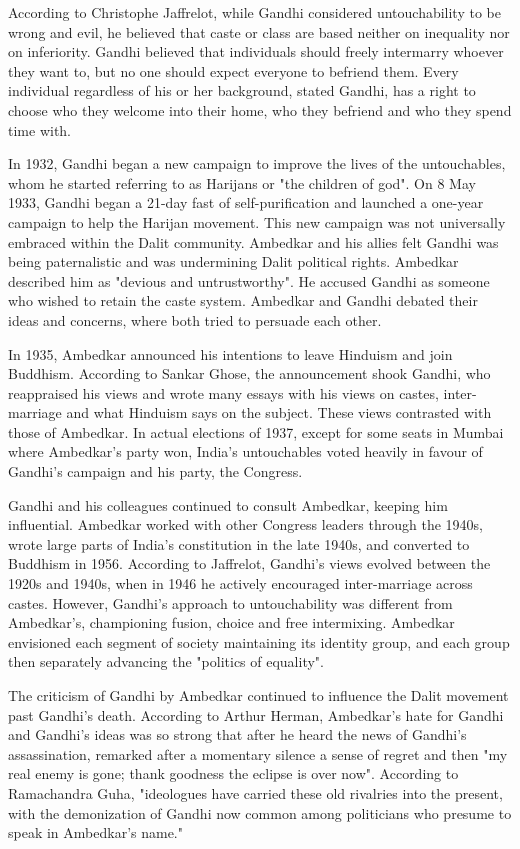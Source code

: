 According to Christophe Jaffrelot, while Gandhi considered
untouchability to be wrong and evil, he believed that caste or class are
based neither on inequality nor on inferiority. Gandhi believed that
individuals should freely intermarry whoever they want to, but no one
should expect everyone to befriend them. Every individual regardless of
his or her background, stated Gandhi, has a right to choose who they
welcome into their home, who they befriend and who they spend time with.

In 1932, Gandhi began a new campaign to improve the lives of the
untouchables, whom he started referring to as Harijans or "the children
of god". On 8 May 1933, Gandhi began a 21-day fast of self-purification
and launched a one-year campaign to help the Harijan movement. This new
campaign was not universally embraced within the Dalit community.
Ambedkar and his allies felt Gandhi was being paternalistic and was
undermining Dalit political rights. Ambedkar described him as "devious
and untrustworthy". He accused Gandhi as someone who wished to retain
the caste system. Ambedkar and Gandhi debated their ideas and concerns,
where both tried to persuade each other.

In 1935, Ambedkar announced his intentions to leave Hinduism and join
Buddhism. According to Sankar Ghose, the announcement shook Gandhi, who
reappraised his views and wrote many essays with his views on castes,
inter-marriage and what Hinduism says on the subject. These views
contrasted with those of Ambedkar. In actual elections of 1937, except
for some seats in Mumbai where Ambedkar's party won, India's
untouchables voted heavily in favour of Gandhi's campaign and his party,
the Congress.

Gandhi and his colleagues continued to consult Ambedkar, keeping him
influential. Ambedkar worked with other Congress leaders through the
1940s, wrote large parts of India's constitution in the late 1940s, and
converted to Buddhism in 1956. According to Jaffrelot, Gandhi's views
evolved between the 1920s and 1940s, when in 1946 he actively encouraged
inter-marriage across castes. However, Gandhi's approach to
untouchability was different from Ambedkar's, championing fusion, choice
and free intermixing. Ambedkar envisioned each segment of society
maintaining its identity group, and each group then separately advancing
the "politics of equality".

The criticism of Gandhi by Ambedkar continued to influence the Dalit
movement past Gandhi's death. According to Arthur Herman, Ambedkar's
hate for Gandhi and Gandhi's ideas was so strong that after he heard the
news of Gandhi's assassination, remarked after a momentary silence a
sense of regret and then "my real enemy is gone; thank goodness the
eclipse is over now". According to Ramachandra Guha, "ideologues have
carried these old rivalries into the present, with the demonization of
Gandhi now common among politicians who presume to speak in Ambedkar's
name."

